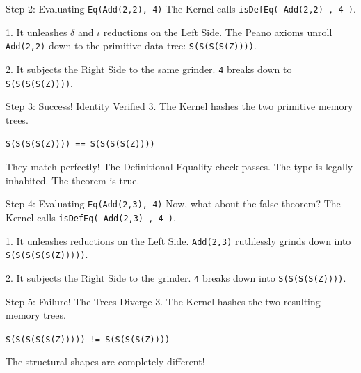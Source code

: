 \documentclass[10pt,aspectratio=169]{beamer}
\begin{document}
\begin{frame}[fragile]{Step 2: Evaluating \texttt{Eq(Add(2,2), 4)}}
    The Kernel calls \verb|isDefEq( Add(2,2) , 4 )|.
    
    1. It unleashes $\delta$ and $\iota$ reductions on the Left Side. The Peano axioms unroll \verb|Add(2,2)| down to the primitive data tree: \verb|S(S(S(S(Z))))|.
    
    2. It subjects the Right Side to the same grinder. \verb|4| breaks down to \verb|S(S(S(S(Z))))|.
\end{frame}

\begin{frame}[fragile]{Step 3: Success! Identity Verified}
    3. The Kernel hashes the two primitive memory trees.
    
    \vspace{1em}
    \begin{center}
        \Large \texttt{S(S(S(S(Z)))) == S(S(S(S(Z))))}
    \end{center}
    
    \vspace{1em}
    They match perfectly! The Definitional Equality check passes. The type is legally inhabited. The theorem is true.
\end{frame}

\begin{frame}[fragile]{Step 4: Evaluating \texttt{Eq(Add(2,3), 4)}}
    Now, what about the false theorem? The Kernel calls \verb|isDefEq( Add(2,3) , 4 )|.
    
    1. It unleashes reductions on the Left Side. \verb|Add(2,3)| ruthlessly grinds down into \verb|S(S(S(S(S(Z)))))|.
    
    2. It subjects the Right Side to the grinder. \verb|4| breaks down into \verb|S(S(S(S(Z))))|.
\end{frame}

\begin{frame}[fragile]{Step 5: Failure! The Trees Diverge}
    3. The Kernel hashes the two resulting memory trees.
    
    \vspace{1em}
    \begin{center}
        \Large \color{red} \texttt{S(S(S(S(S(Z))))) != S(S(S(S(Z))))}
    \end{center}
    
    \vspace{1em}
    The structural shapes are completely different! 
\end{frame}
\end{document}
